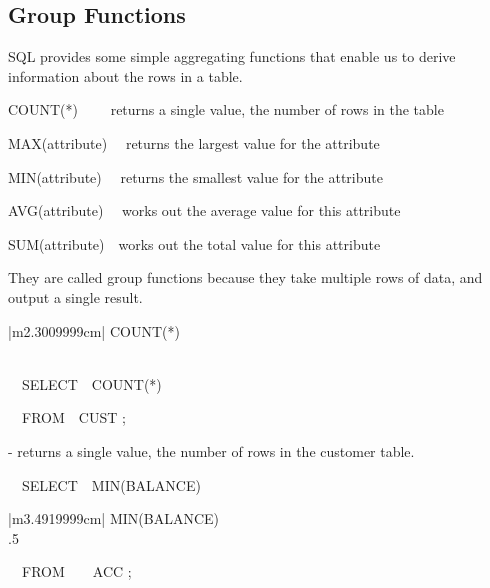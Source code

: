\subsection{Group Functions}
SQL provides some simple aggregating functions that enable us to derive information about the rows in a table.

COUNT(*) \ \ \ \ returns a single value, the number of rows in the table

MAX(attribute) \ \ returns the largest value for the attribute

MIN(attribute) \ \ returns the smallest value for the attribute

AVG(attribute) \ \ works out the average value for this attribute

SUM(attribute)\ \ works out the total value for this attribute

They are called {\textquotedbl}group{\textquotedbl} functions because they take multiple rows of data, and output a single result.

\begin{center}
\begin{minipage}{2.501cm}
\begin{center}
\tablefirsthead{}
\tablehead{}
\tabletail{}
\tablelasttail{}
\begin{supertabular}{|m{2.3009999cm}|}
\hline
COUNT(*)\\\\
\end{supertabular}
\end{center}
\end{minipage}
\end{center}
\ \ SELECT\ \ COUNT(*)

\ \  FROM\ \ CUST ;

{}- returns a single value, the number of rows in the customer table.

\ \ SELECT\ \ MIN(BALANCE)

\begin{center}
\begin{minipage}{3.692cm}
\begin{flushleft}
\tablefirsthead{}
\tablehead{}
\tabletail{}
\tablelasttail{}
\begin{supertabular}{|m{3.4919999cm}|}
\hline
MIN(BALANCE)\\\hline
.5\\
\end{supertabular}
\end{flushleft}
\end{minipage}
\end{center}
\ \ FROM\ \ \ \  ACC ;

